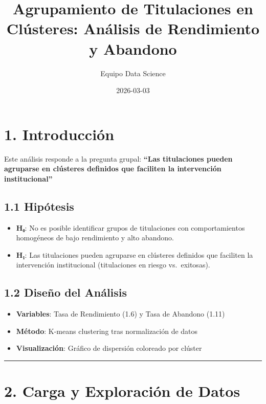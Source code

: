 \documentclass[
]{article}
\title{Agrupamiento de Titulaciones en Clústeres: Análisis de
Rendimiento y Abandono}
\author{Equipo Data Science}
\date{2026-03-03}
\providecommand{\tightlist}{%
  \setlength{\itemsep}{0pt}\setlength{\parskip}{0pt}}
\begin{document}
\maketitle

{
\setcounter{tocdepth}{2}
\tableofcontents
}
\section{1. Introducción}\label{introducciuxf3n}

Este análisis responde a la pregunta grupal: \textbf{``Las titulaciones
pueden agruparse en clústeres definidos que faciliten la intervención
institucional''}

\subsection{1.1 Hipótesis}\label{hipuxf3tesis}

\begin{itemize}
\tightlist
\item
  \textbf{H₀}: No es posible identificar grupos de titulaciones con
  comportamientos homogéneos de bajo rendimiento y alto abandono.
\item
  \textbf{H₁}: Las titulaciones pueden agruparse en clústeres definidos
  que faciliten la intervención institucional (titulaciones en riesgo
  vs.~exitosas).
\end{itemize}

\subsection{1.2 Diseño del Análisis}\label{diseuxf1o-del-anuxe1lisis}

\begin{itemize}
\tightlist
\item
  \textbf{Variables}: Tasa de Rendimiento (1.6) y Tasa de Abandono
  (1.11)
\item
  \textbf{Método}: K-means clustering tras normalización de datos
\item
  \textbf{Visualización}: Gráfico de dispersión coloreado por clúster
\end{itemize}

\begin{center}\rule{0.5\linewidth}{0.5pt}\end{center}

\section{2. Carga y Exploración de
Datos}\label{carga-y-exploraciuxf3n-de-datos}
\end{document}
